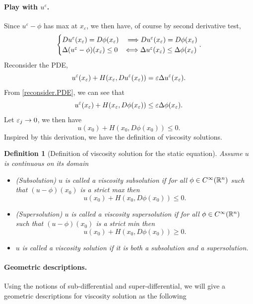 \documentclass[12pt, oneside]{amsart}  	%
\newtheorem{definition}{Definition}
\begin{document}
\paragraph{\textbf{Play with $u^\varepsilon$.}} Since $u^\varepsilon -\phi$ has max at $x_\varepsilon$, we then have, of course by second derivative test,
\begin{equation}\label{reconsider.PDE}
\begin{cases}
	Du^\varepsilon(x_\varepsilon)=D\phi(x_\varepsilon) &\;\Longrightarrow Du^\varepsilon(x_\varepsilon) = D\phi(x_\varepsilon) \\
	\Delta(u^\varepsilon - \phi)(x_\varepsilon)\le 0 &\Longleftrightarrow \Delta u^\varepsilon(x_\varepsilon)\le \Delta\phi(x_\varepsilon)
\end{cases}.
\end{equation}
Reconsider the PDE,
\begin{equation*}
u^\varepsilon(x_\varepsilon) + H(x_\varepsilon, Du^\varepsilon(x_\varepsilon))=\varepsilon \Delta u^\varepsilon(x_\varepsilon).
\end{equation*}
From \eqref{reconsider.PDE}, we can see that
\begin{equation*}
u^\varepsilon(x_\varepsilon) + H(x_\varepsilon, D\phi(x_\varepsilon))\le \varepsilon \Delta\phi(x_\varepsilon).
\end{equation*}
Let $\varepsilon_j\to 0$, we then have
\begin{equation*}
u(x_0)+ H(x_0, D\phi(x_0))\le 0.
\end{equation*}
Inspired by this derivation, we have the definition of viscosity solutions.
	
\begin{definition} [Definition of viscosity solution for the static equation] Assume $u$ is continuous on its domain
\begin{itemize}
\item (Subsolution) $u$ is called a viscosity subsolution if for all $\phi\in C^\infty(\mathbb{R}^n)$ such that $(u-\phi)(x_0)$ is a strict max then 
$$u(x_0) + H(x_0, D\phi(x_0))\le 0.$$
\item (Supersolution) $u$ is called a viscosity supersolution if for all $\phi\in C^\infty(\mathbb{R}^n)$ such that $(u-\phi)(x_0)$ is a strict min then 
$$u(x_0) + H(x_0, D\phi(x_0))\ge 0.$$
\item $u$ is called a viscosity solution if it is both a subsolution and a supersolution.
\end{itemize}
\end{definition}

\paragraph{\textbf{Geometric descriptions.}} Using the notions of sub-differential and super-differential, we will give a geometric descriptions for viscosity solution as the following
\end{document}
